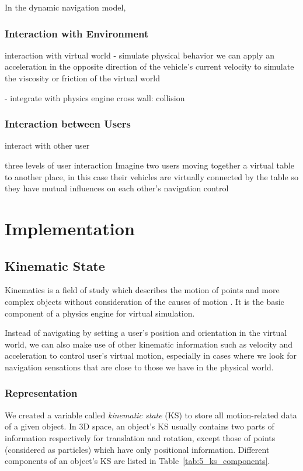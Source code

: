 In the dynamic navigation model, 


\subsubsection{Interaction with Environment}
interaction with virtual world
 - simulate physical behavior         we can apply an acceleration in the opposite direction of the vehicle's current velocity to
                                     simulate the viscosity or friction of the virtual world

 - integrate with physics engine      cross wall: collision

\subsubsection{Interaction between Users}
interact with other user             

three levels of user interaction
Imagine two users moving together a virtual table to another place, in this case their vehicles are virtually connected by the table so they have mutual influences on each other's navigation control



\section{Implementation}
\subsection{Kinematic State}
Kinematics is a field of study which describes the motion of points and more complex objects without consideration of the causes of motion \citep{Beggs1983Kinematics}. It is the basic component of a physics engine for virtual simulation.

Instead of navigating by setting a user's position and orientation in the virtual world, we can also make use of other kinematic information such as velocity and acceleration to control user's virtual motion, especially in cases where we look for navigation sensations that are close to those we have in the physical world. 

\subsubsection{Representation}
We created a variable called \textit{kinematic state} (KS) to store all motion-related data of a given object. In 3D space, an object's KS usually contains two parts of information respectively for translation and rotation, except those of points (considered as particles) which have only positional information. Different components of an object's KS are listed in Table~\ref{tab:5_ks_components}.

